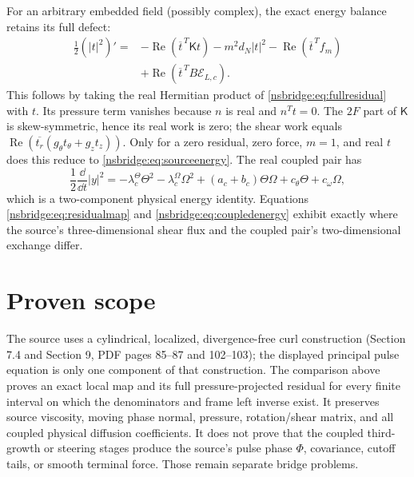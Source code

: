 For an arbitrary embedded field (possibly complex), the exact energy balance
retains its full defect:
\begin{equation}
 \begin{split}
 \frac12(|t|^2)'={}&-\operatorname{Re}(\overline t^{\,T}\mathsf Kt)
 -m^2d_N|t|^2-\operatorname{Re}(\overline t^{\,T}f_m)\\
 &+\operatorname{Re}(\overline t^{\,T}B\mathcal E_{L,c}).
 \end{split}
\end{equation}
This follows by taking the real Hermitian product of
\eqref{nsbridge:eq:fullresidual} with $t$. Its pressure term vanishes because $n$ is
real and $n^Tt=0$. The $2F$ part of $\mathsf K$ is skew-symmetric, hence
its real work is zero; the shear work equals
$\operatorname{Re}(\overline{t_r}(g_\theta t_\theta+g_z t_z))$.
Only for a zero residual, zero force, $m=1$, and real $t$ does this reduce
to \eqref{nsbridge:eq:sourceenergy}. The real coupled pair has
\begin{equation}
 \frac12\frac{\dd}{\dd t}|y|^2
 =-\lambda_c^\Theta\Theta^2-\lambda_c^\Omega\Omega^2
 +(a_c+b_c)\Theta\Omega+c_\theta\Theta+c_\omega\Omega,
 \label{nsbridge:eq:coupledenergy}
\end{equation}
which is a two-component physical energy identity.  Equations
\eqref{nsbridge:eq:residualmap} and \eqref{nsbridge:eq:coupledenergy} exhibit exactly where the
source's three-dimensional shear flux and the coupled pair's two-dimensional
exchange differ.

\section{Proven scope}
The source uses a cylindrical, localized, divergence-free curl construction
(Section 7.4 and Section 9, PDF pages 85--87 and 102--103); the displayed
principal pulse equation is only one component of that construction.  The
comparison above proves an exact local map and its full pressure-projected
residual for every finite interval on which the denominators and frame left
inverse exist.  It preserves source viscosity, moving phase normal, pressure,
rotation/shear matrix, and all coupled physical diffusion coefficients.  It does
not prove that the coupled third-growth or steering stages produce the source's
pulse phase $\Phi$, covariance, cutoff tails, or smooth terminal force.  Those
remain separate bridge problems.

